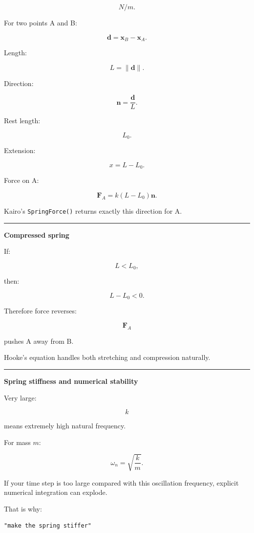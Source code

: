 \[
N/m.
\]

For two points A and B:

\[
\mathbf{d}
=
\mathbf{x}_B-\mathbf{x}_A.
\]

Length:

\[
L=\|\mathbf{d}\|.
\]

Direction:

\[
\mathbf{n}
=
\frac{\mathbf{d}}{L}.
\]

Rest length:

\[
L_0.
\]

Extension:

\[
x=L-L_0.
\]

Force on A:

\[
\boxed{
\mathbf{F}_A
=
k(L-L_0)\mathbf{n}.
}
\]

Kairo's \texttt{SpringForce()} returns exactly this direction for A.

\begin{center}\rule{0.5\linewidth}{0.5pt}\end{center}

\textbf{Compressed spring}

If:

\[
L<L_0,
\]

then:

\[
L-L_0<0.
\]

Therefore force reverses:

\[
\mathbf{F}_A
\]

pushes A away from B.

Hooke's equation handles both stretching and compression naturally.

\begin{center}\rule{0.5\linewidth}{0.5pt}\end{center}

\textbf{Spring stiffness and numerical stability}

Very large:

\[
k
\]

means extremely high natural frequency.

For mass \(m\):

\[
\omega_n
=
\sqrt{\frac{k}{m}}.
\]

If your time step is too large compared with this oscillation frequency, explicit numerical integration can explode.

That is why:

\begin{verbatim}
"make the spring stiffer"
\end{verbatim}

